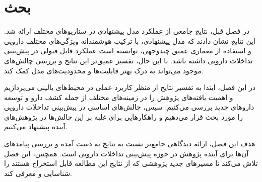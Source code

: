 \chapter{بحث}

در فصل قبل، نتایج جامعی از عملکرد مدل پیشنهادی در سناریوهای مختلف ارائه شد. این نتایج نشان دادند که مدل پیشنهادی، با ترکیب هوشمندانه ویژگی‌های مختلف دارویی و استفاده از معماری عمیق چندوجهی، توانسته است عملکرد قابل قبولی در پیش‌بینی تداخلات دارویی داشته باشد. با این حال، تفسیر عمیق‌تر این نتایج و بررسی چالش‌های موجود می‌تواند به درک بهتر قابلیت‌ها و محدودیت‌های مدل کمک کند.

در این فصل، ابتدا به تفسیر نتایج از منظر کاربرد عملی در محیط‌های بالینی می‌پردازیم و اهمیت یافته‌های پژوهش را در زمینه‌های مختلف از جمله کشف دارو و توسعه داروهای جدید بررسی می‌کنیم. سپس، چالش‌های اساسی در پیش‌بینی تداخلات دارویی را مورد بحث قرار می‌دهیم و راهکارهایی برای غلبه بر این چالش‌ها در پژوهش‌های آینده پیشنهاد می‌کنیم.

هدف این فصل، ارائه دیدگاهی جامع‌تر نسبت به نتایج به دست آمده و بررسی پیامدهای آن‌ها برای آینده پژوهش در حوزه پیش‌بینی تداخلات دارویی است. همچنین، این فصل تلاش می‌کند تا مسیرهای جدید پژوهشی که از نتایج این مطالعه قابل استخراج هستند را شناسایی و معرفی کند.
